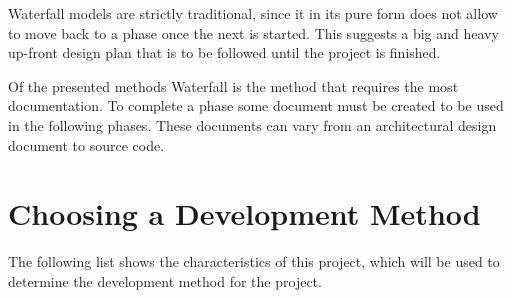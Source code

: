 Waterfall models are strictly traditional, since it in its pure form does not allow to move back to a phase once the next is started.
This suggests a big and heavy up-front design plan that is to be followed until the project is finished.

Of the presented methods Waterfall is the method that requires the most documentation.
To complete a phase some document must be created to be used in the following phases.
These documents can vary from an architectural design document to source code.

\section{Choosing a Development Method}
\label{subsec:choosingmethod}
The following list shows the characteristics of this project, which will be used to determine the development method for the project.
